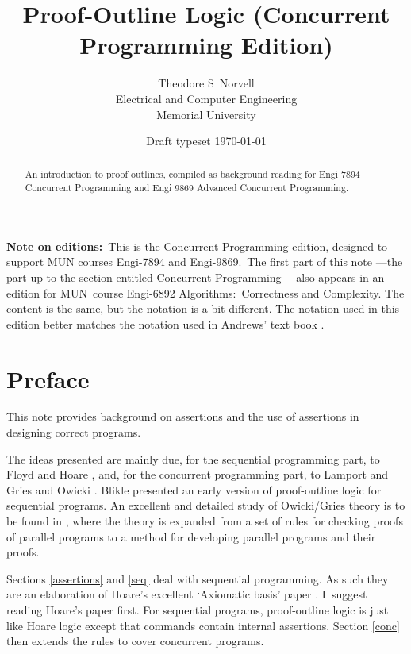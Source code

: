\documentclass[muchmore,11pt]{article}%
\begin{document}
\title{Proof-Outline Logic (Concurrent Programming Edition)}
\author{Theodore S\ Norvell\\Electrical and Computer Engineering\\Memorial University}
\date{Draft typeset
\today
}
\maketitle

\begin{abstract}
An introduction to proof outlines, compiled as background reading for Engi
7894 Concurrent Programming and Engi 9869 Advanced Concurrent Programming.

\end{abstract}

\textbf{Note on editions:}\ This is the Concurrent Programming edition,
designed to support MUN courses Engi-7894 and Engi-9869.\ The first part of
this note ---the part up to the section entitled Concurrent Programming---
also appears in an edition for MUN\ course Engi-6892 Algorithms:\ Correctness
and Complexity. The content is the same, but the notation is a bit different.
The notation used in this edition better matches the notation used in Andrews'
text book \cite{Andrews2000}.

\section{Preface}

This note provides background on assertions and the use of assertions in
designing correct programs.

The ideas presented are mainly due, for the sequential programming part, to
Floyd \cite{Floyd670} and Hoare \cite{Hoare690}, and, for the concurrent
programming part, to Lamport \cite{Lamport-1977} and Gries and Owicki
\cite{OwickiGries-1976-aptpp,OwickiGries-1976-vpppaa}. Blikle
\cite{Blikle1979} presented an early version of proof-outline logic for
sequential programs. An excellent and detailed study of Owicki/Gries theory is
to be found in \cite{FeijenVanGasteren990}, where the theory is expanded from
a set of rules for checking proofs of parallel programs to a method for
developing parallel programs and their proofs.

Sections \ref{assertions} and \ref{seq} deal with sequential programming. As
such they are an elaboration of Hoare's excellent `Axiomatic basis' paper
\cite{Hoare690}. I\ suggest reading Hoare's paper first. For sequential
programs, proof-outline logic is just like Hoare logic except that commands
contain internal assertions. Section \ref{conc} then extends the rules to
cover concurrent programs.
\end{document}
